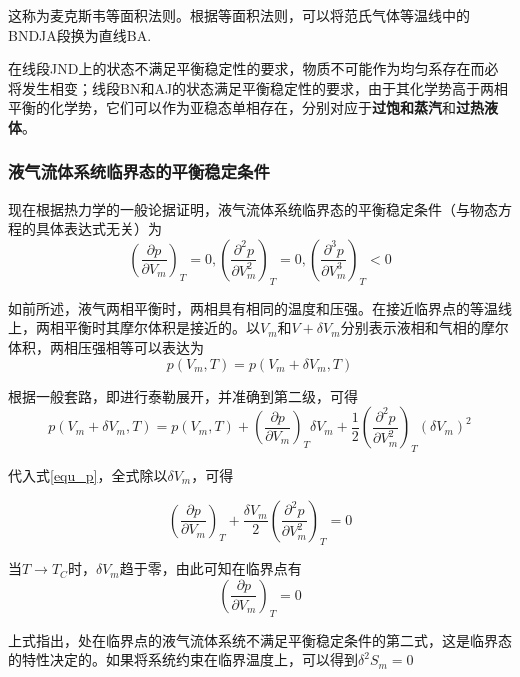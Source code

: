 \documentclass[UTF8]{ctexart}
\begin{document}
\noindent 这称为麦克斯韦等面积法则。根据等面积法则，可以将范氏气体等温线中的BNDJA段换为直线BA.

	在线段JND上的状态不满足平衡稳定性的要求，物质不可能作为均匀系存在而必将发生相变；线段BN和AJ的状态满足平衡稳定性的要求，由于其化学势高于两相平衡的化学势，它们可以作为亚稳态单相存在，分别对应于\textbf{过饱和蒸汽}和\textbf{过热液体}。
	
	\subsubsection{液气流体系统临界态的平衡稳定条件}
	现在根据热力学的一般论据证明，液气流体系统临界态的平衡稳定条件（与物态方程的具体表达式无关）为
	\begin{equation}
	\left(\frac{\partial p}{\partial V_{m}}\right)_{T}=0, \left(\frac{\partial^{2} p}{\partial V_{m}^{2}}\right)_{T}=0,\left(\frac{\partial^{3} p}{\partial V_{m}^{3}}\right)_{T}<0
	\end{equation}
	
\noindent 如前所述，液气两相平衡时，两相具有相同的温度和压强。在接近临界点的等温线上，两相平衡时其摩尔体积是接近的。以$ V_{m} $和$ V+\delta V_{m} $分别表示液相和气相的摩尔体积，两相压强相等可以表达为
\begin{equation}
p\left(V_{m}, T\right)=p\left(V_{m}+\delta V_{m}, T\right)\label{equ_p}
\end{equation}

\noindent 根据一般套路，即进行泰勒展开，并准确到第二级，可得
\begin{equation}
p\left(V_{m}+\delta V_{m}, T\right)=p\left(V_{m}, T\right)+\left(\frac{\partial p}{\partial V_{m}}\right)_{T} \delta V_{m}+\frac{1}{2}\left(\frac{\partial^{2} p}{\partial V_{m}^{2}}\right)_{T}\left(\delta V_{m}\right)^{2}
\end{equation}

\noindent 代入式\ref{equ_p}，全式除以$ \delta V_{m} $，可得

\begin{equation}
\left(\frac{\partial p}{\partial V_{m}}\right)_{T}+\frac{\delta V_{m}}{2}\left(\frac{\partial^{2} p}{\partial V_{m}^{2}}\right)_{T}=0
\end{equation}

\noindent 当$ T \rightarrow T_{C} $时，$ \delta V_{m} $趋于零，由此可知在临界点有
\begin{equation}
\left(\frac{\partial p}{\partial V_{m}}\right)_{T}=0
\end{equation}

\noindent 上式指出，处在临界点的液气流体系统不满足平衡稳定条件的第二式，这是临界态的特性决定的。如果将系统约束在临界温度上，可以得到$ \delta^{2} S_{m}=0 $
\end{document}
